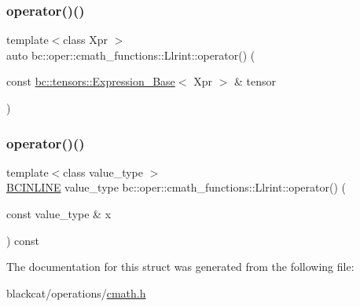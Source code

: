 \mbox{\label{structbc_1_1oper_1_1cmath__functions_1_1Llrint_a3af811bd92a65905435e2b5e3fe08d4e}} 
\subsubsection{\texorpdfstring{operator()()}{operator()()}\hspace{0.1cm}{\footnotesize\ttfamily [2/3]}}
{\footnotesize\ttfamily template$<$class Xpr $>$ \\
auto bc\+::oper\+::cmath\+\_\+functions\+::\+Llrint\+::operator() (\begin{DoxyParamCaption}\item[{const \hyperlink{classbc_1_1tensors_1_1Expression__Base}{bc\+::tensors\+::\+Expression\+\_\+\+Base}$<$ Xpr $>$ \&}]{tensor }\end{DoxyParamCaption})\hspace{0.3cm}{\ttfamily [inline]}}

\mbox{\label{structbc_1_1oper_1_1cmath__functions_1_1Llrint_a93cbea72af8261ad2fa49fc11563e82e}} 
\subsubsection{\texorpdfstring{operator()()}{operator()()}\hspace{0.1cm}{\footnotesize\ttfamily [3/3]}}
{\footnotesize\ttfamily template$<$class value\+\_\+type $>$ \\
\hyperlink{common_8h_a6699e8b0449da5c0fafb878e59c1d4b1}{B\+C\+I\+N\+L\+I\+NE} value\+\_\+type bc\+::oper\+::cmath\+\_\+functions\+::\+Llrint\+::operator() (\begin{DoxyParamCaption}\item[{const value\+\_\+type \&}]{x }\end{DoxyParamCaption}) const\hspace{0.3cm}{\ttfamily [inline]}}



The documentation for this struct was generated from the following file\+:\begin{DoxyCompactItemize}
\item 
blackcat/operations/\hyperlink{cmath_8h}{cmath.\+h}\end{DoxyCompactItemize}
